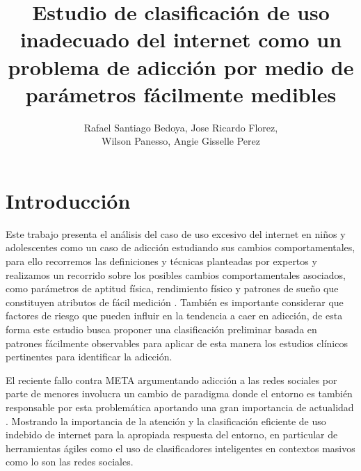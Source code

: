 \documentclass[10pt,letterpaper]{article}
\title{Estudio de clasificación de uso inadecuado del internet como un problema de adicción por medio de parámetros fácilmente medibles}
\author{Rafael Santiago Bedoya, Jose Ricardo Florez, \\ Wilson Panesso, Angie Gisselle Perez}
\date{}                     %
\begin{document}
\maketitle                        %





\section{Introducción}
Este trabajo presenta el análisis del caso de uso excesivo del internet en niños y adolescentes como un caso de adicción estudiando sus cambios comportamentales, para ello recorremos las definiciones y técnicas planteadas por expertos  \citep{bishopaddictions} y realizamos un recorrido sobre los posibles cambios comportamentales asociados, como parámetros de aptitud física, rendimiento físico y patrones de sueño que constituyen atributos de fácil medición \citep{lifestyle_changes}. También es importante considerar que factores de riesgo que pueden influir en la tendencia a caer en adicción, de esta forma este estudio busca proponer una clasificación preliminar basada en patrones fácilmente observables para aplicar de esta manera los estudios clínicos pertinentes para identificar la adicción.

El reciente fallo contra META argumentando adicción a las redes sociales por parte de menores involucra un cambio de paradigma donde el entorno es también responsable por esta problemática aportando una gran importancia de actualidad \citep{reuters2026meta}. Mostrando la importancia de la atención y la clasificación eficiente de uso indebido de internet para la apropiada respuesta del entorno, en particular de herramientas ágiles como el uso de clasificadores inteligentes en contextos masivos como lo son las redes sociales.

\newpage
\end{document}

